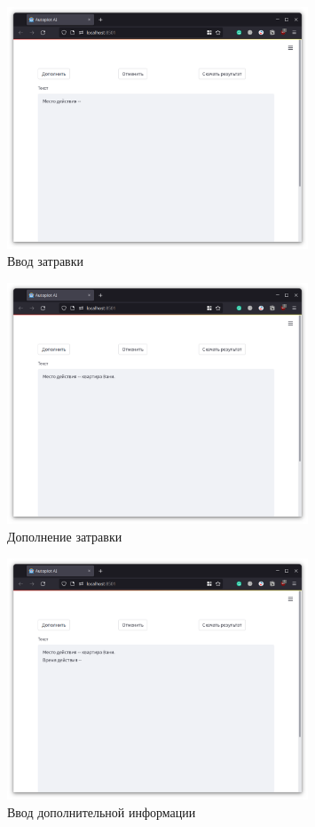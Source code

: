 \begin{figure}
    \centering
    \includegraphics[width=0.8\textwidth]{../inc/images/demo-0.png}
    \caption{Ввод затравки}
    \label{fig:demo-0}
\end{figure}
\begin{figure}
    \centering
    \includegraphics[width=0.8\textwidth]{../inc/images/demo-1.png}
    \caption{Дополнение затравки}
    \label{fig:demo-1}
\end{figure}
\begin{figure}
    \centering
    \includegraphics[width=0.8\textwidth]{../inc/images/demo-2.png}
    \caption{Ввод дополнительной информации}
    \label{fig:demo-2}
\end{figure}
